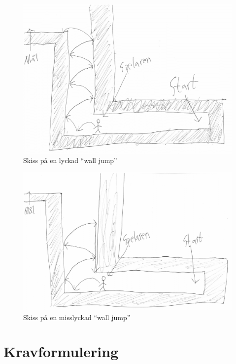 \documentclass{TDP003mall}
\begin{document}
\begin{figure}[h]
  \centering
  \includegraphics[scale=0.10]{success}
  \caption{Skiss på en lyckad ``wall jump''}
  \label{Skiss på en lyckad ``wall jump''}
\end{figure}

\begin{figure}[h]
  \centering
  \includegraphics[scale=0.10]{fail}
  \caption{Skiss på en misslyckad ``wall jump''}
  \label{Skiss på en misslyckad ``wall jump''}
\end{figure}

\newpage

\section{Kravformulering}
\end{document}
